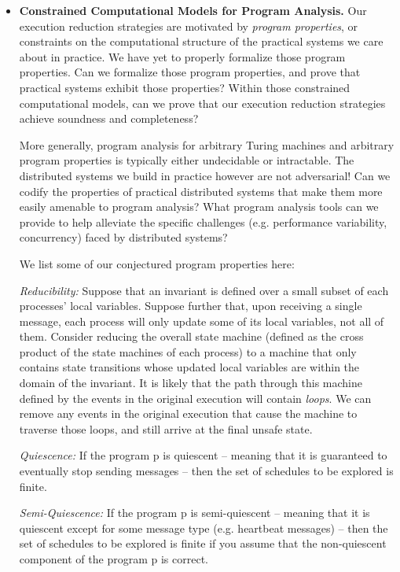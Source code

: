 \begin{itemize}

\item \textbf{Constrained Computational Models for Program Analysis.} Our
execution reduction strategies are motivated by
\textit{program properties}, or constraints
on the computational structure of the practical systems we care about in
practice. We have yet to properly formalize those program properties. Can we formalize those program properties, and prove that practical systems exhibit those properties? Within those
constrained computational models, can we prove that our execution reduction
strategies achieve
soundness and completeness?

More generally, program analysis for arbitrary Turing machines and arbitrary program properties
is typically either undecidable or intractable. The distributed systems we build
in practice however are not adversarial! Can we codify the properties of practical
distributed systems that make them more easily
amenable to program analysis? What program analysis tools can we provide to help
alleviate the specific challenges (e.g. performance variability, concurrency) faced
by distributed systems?

We list some of our conjectured program properties here:

\textit{Reducibility:} Suppose that an invariant is defined over a small
subset of each processes' local variables. Suppose further that, upon
receiving a single message, each process will only update some
of its local variables, not all of them. Consider reducing the overall state
machine (defined as the cross product of the
state machines of each process) to a machine that only contains state transitions
whose updated local variables are within the domain of the invariant. It is likely
that the path through this machine defined by the events in the original execution
will contain \textit{loops}. We can remove any events in the original
execution that cause the machine to traverse those loops, and still arrive at
the final unsafe state.

\textit{Quiescence:} If the program p is quiescent -- meaning that it is
guaranteed to eventually stop sending messages -- then the set of schedules to
be explored is finite.

\textit{Semi-Quiescence:} If the program p is semi-quiescent -- meaning that it is quiescent except for
some message type (e.g. heartbeat messages) -- then the set of schedules to be
explored is finite if you assume that the non-quiescent component of the
program p is correct.


\end{itemize}
